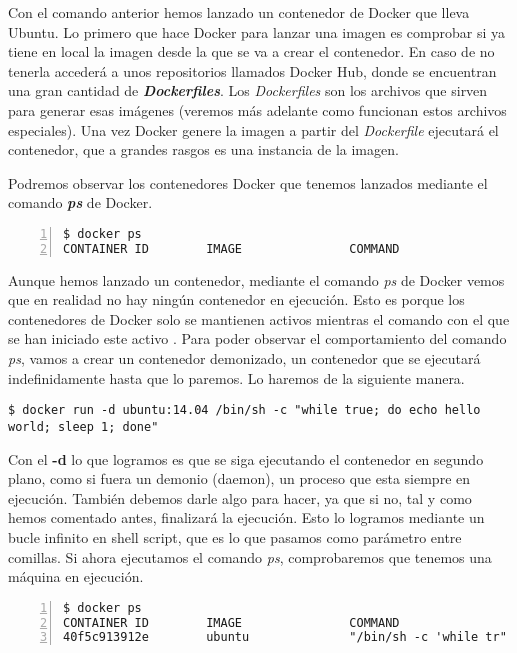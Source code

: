 	Con el comando anterior hemos lanzado un contenedor de Docker que lleva Ubuntu. Lo primero que hace Docker para lanzar una imagen es comprobar si ya tiene en local la imagen desde la que se va a crear el contenedor. En caso de no tenerla accederá a unos repositorios llamados Docker Hub, donde se encuentran una gran cantidad de \textbf{\emph{Dockerfiles}}. Los \emph{Dockerfiles} son los archivos que sirven para generar esas imágenes (veremos más adelante como funcionan estos archivos especiales). Una vez Docker genere la imagen a partir del \textit{Dockerfile} ejecutará el contenedor, que a grandes rasgos es una instancia de la imagen.
	
	Podremos observar los contenedores Docker que tenemos lanzados mediante el comando \textbf{\emph{ps}} de Docker.
	
	\begin{lstlisting}[style=consola,numbers=left]
$ docker ps
CONTAINER ID        IMAGE               COMMAND                  CREATED             STATUS              PORTS               NAMES
	\end{lstlisting}
	
	Aunque hemos lanzado un contenedor, mediante el comando \emph{ps} de Docker vemos que en realidad no hay ningún contenedor en ejecución. Esto es porque los contenedores de Docker solo se mantienen activos mientras el comando con el que se han iniciado este activo \cite{docker-run}. Para poder observar el comportamiento del comando \emph{ps}, vamos a crear un contenedor demonizado, un contenedor que se ejecutará indefinidamente hasta que lo paremos. Lo haremos de la siguiente manera.
	
	\begin{lstlisting}[style=consola]
$ docker run -d ubuntu:14.04 /bin/sh -c "while true; do echo hello world; sleep 1; done"
	\end{lstlisting}
	
	Con el \textbf{-d} lo que logramos es que se siga ejecutando el contenedor en segundo plano, como si fuera un demonio (daemon), un proceso que esta siempre en ejecución. También debemos darle algo para hacer, ya que si no, tal y como hemos comentado antes, finalizará la ejecución. Esto lo logramos mediante un bucle infinito en shell script, que es lo que pasamos como parámetro entre comillas. Si ahora ejecutamos el comando \emph{ps}, comprobaremos que tenemos una máquina en ejecución.
	
	\begin{lstlisting}[style=consola,numbers=left]
$ docker ps
CONTAINER ID        IMAGE               COMMAND                  CREATED             STATUS              PORTS               NAMES
40f5c913912e        ubuntu              "/bin/sh -c 'while tr"   2 seconds ago       Up 2 seconds                            adoring_euclid
	\end{lstlisting}
	
